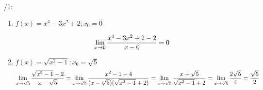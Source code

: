 /1:
\begin{enumerate}
	\item $f(x)=x^4-3x^2+2; x_0=0$

	$$\lim_{x\rightarrow 0} \frac{x^4-3x^2+2-2}{x-0} = 0 $$

\item $f(x)=\sqrt{x^2-1};x_0=\sqrt 5$
	$$
		\lim_{x\rightarrow \sqrt 5} \frac{\sqrt{x^2-1}-2}{x-\sqrt 5}
		=
		\lim_{x\rightarrow \sqrt 5} \frac{x^2-1-4}{(x- \sqrt5)(\sqrt{x^2-1}+2)}
		=
		\lim_{x\rightarrow \sqrt 5} \frac{x+\sqrt 5}{\sqrt{x^2-1}+2}
		=
		\lim_{x\rightarrow \sqrt 5} \frac{2\sqrt 5}{4}
		=
		\frac{\sqrt 5}{2}
	$$
\end{enumerate}


\EndDoc
